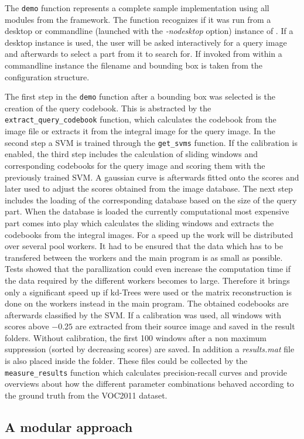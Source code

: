 The \verb|demo| function represents a complete sample implementation using all modules from the framework. The function recognizes if it was run from a desktop or commandline (launched with the \textit{-nodesktop} option) instance of \MATLAB. If a desktop instance is used, the user will be asked interactively for a query image and afterwards to select a part from it to search for. If invoked from within a commandline instance the filename and bounding box is taken from the configuration structure.

The first step in the \verb|demo| function after a bounding box was selected is the creation of the query codebook. This is abstracted by the \verb|extract_query_codebook| function, which calculates the codebook from the image file or extracts it from the integral image for the query image. In the second step a \ac{SVM} is trained through the \verb|get_svms| function. If the calibration is enabled, the third step includes the calculation of sliding windows and corresponding codebooks for the query image and scoring them with the previously trained \ac{SVM}. A gaussian curve is afterwards fitted onto the scores and later used to adjust the scores obtained from the image database. The next step includes the loading of the corresponding database based on the size of the query part. When the database is loaded the currently computational most expensive part comes into play which calculates the sliding windows and extracts the codebooks from the integral images. For a speed up the work will be distributed over several pool workers. It had to be ensured that the data which has to be transfered between the workers and the main program is as small as possible. Tests showed that the parallization could even increase the computation time if the data required by the different workers becomes to large. Therefore it brings only a significant speed up if kd-Trees were used or the matrix reconstruction is done on the workers instead in the main program. The obtained codebooks are afterwards classified by the \ac{SVM}. If a calibration was used, all windows with scores above $-0.25$ are extracted from their source image and saved in the result folders. Without calibration, the first 100 windows after a non maximum suppression (sorted by decreasing scores) are saved. In addition a \textit{results.mat} file is also placed inside the folder. These files could be collected by the \verb|measure_results| function which calculates precision-recall curves and provide overviews about how the different parameter combinations behaved according to the ground truth from the \ac{VOC2011} dataset.




\subsection{A modular approach}
